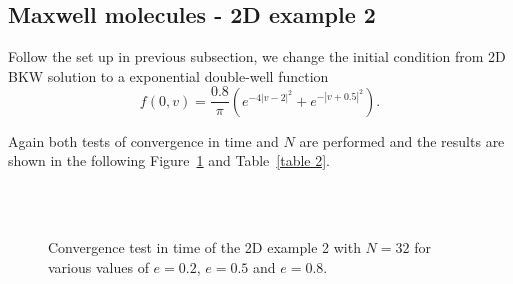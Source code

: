 \documentclass[review, times]{elsarticle}
\begin{document}
\subsection{Maxwell molecules - 2D example 2}

Follow the set up in previous subsection, we change the initial condition from 2D BKW solution to a exponential double-well function
\begin{equation}
  f(0, v) = \frac{0.8}{\pi}\left(e^{-4|v-2|^2} + e^{-|v+0.5|^2}\right).
\end{equation}

Again both tests of convergence in time and $N$ are performed and the results are shown in the following Figure~\ref{conv_dt_2} and Table~\ref{table 2}.

\begin{figure}[H]
  \centering
   \\
   \\
  \caption{Convergence test in time of the 2D example 2 with $N = 32$ for various values of $e=0.2$, $e=0.5$ and $e=0.8$.}
  \label{conv_dt_2}
\end{figure}
\end{document}
